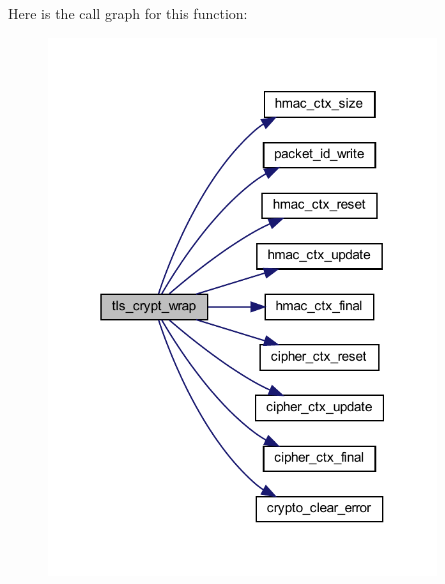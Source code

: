Here is the call graph for this function\+:
\nopagebreak
\begin{figure}[H]
\begin{center}
\leavevmode
\includegraphics[width=292pt]{group__tls__crypt_gadaca5f414562a243603a60a0e3158e5a_cgraph}
\end{center}
\end{figure}


